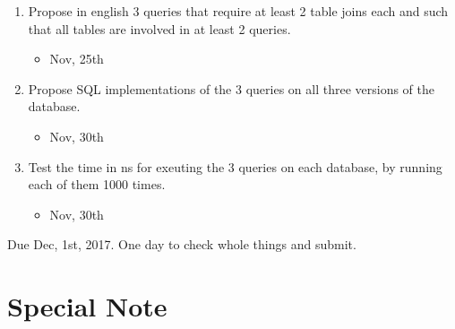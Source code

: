 \documentclass[12pt]{article}
\begin{document}
\begin{enumerate}
\begin{itemize}
	\end{itemize}
	\item Propose in english 3 queries that require at least 2 table joins each and such that all tables are involved in at least 2 queries.
	\begin{itemize}
		\item Nov, 25th
	\end{itemize}
	\item Propose SQL implementations of the 3 queries on all three versions of the database.
	\begin{itemize}
		\item Nov, 30th
	\end{itemize}
	\item Test the time in ns for exeuting the 3 queries on each database, by running each of them 1000 times.
	\begin{itemize}
		\item Nov, 30th
	\end{itemize}
\end{enumerate}

Due Dec, 1st, 2017. One day to check whole things and submit.

\section{Special Note}
\end{document}
